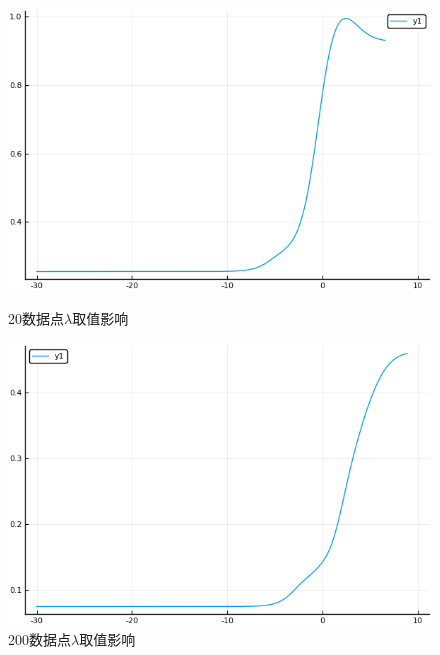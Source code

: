 \documentclass{ML}
\begin{document}
\begin{figure}[H]
	\begin{minipage}[c]{0.5\linewidth}
		\centering
		\includegraphics[width=0.9\linewidth]{media/20/SGDWithLambda-Lambda-err}
		\caption{20数据点$\lambda$取值影响}
		\label{fig:sgdlambdaerr20}
	\end{minipage}
	\begin{minipage}[c]{0.5\linewidth}
		\centering
		\includegraphics[width=0.9\linewidth]{media/200/SGDWithLambda-Lambda-err}
		\caption{200数据点$\lambda$取值影响}
		\label{fig:sgdlambdaerr200}
	\end{minipage}
\end{figure}
\end{document}
